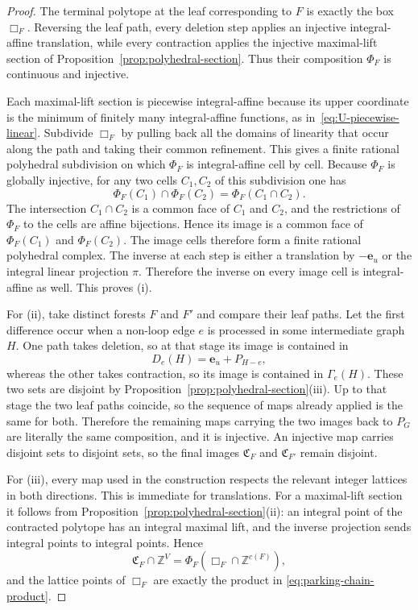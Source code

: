\documentclass[10pt,a4paper]{amsart}
\newcommand{\ZZ}{\mathbb Z}
\newcommand{\be}{\mathbf{e}}
\newcommand{\fC}{\mathfrak C}    %
\begin{document}
\begin{proof}
The terminal polytope at the leaf corresponding to $F$ is exactly the box
$\Box_F$.  Reversing the leaf path, every deletion step applies an injective
integral-affine translation, while every contraction applies the injective maximal-lift section of Proposition~\ref{prop:polyhedral-section}.  Thus their
composition $\Phi_F$ is continuous and injective.

Each maximal-lift section is piecewise integral-affine because its upper coordinate
is the minimum of finitely many integral-affine functions, as in~\eqref{eq:U-piecewise-linear}.
Subdivide $\Box_F$ by pulling back all the domains of linearity that occur along the path
and taking their common refinement.
This gives a finite rational polyhedral subdivision on which $\Phi_F$ is integral-affine cell by cell.
Because $\Phi_F$ is globally injective, for any two cells $C_1,C_2$ of this subdivision one has
\[
   \Phi_F(C_1)\cap\Phi_F(C_2)=\Phi_F(C_1\cap C_2).
\]
The intersection $C_1\cap C_2$ is a common face of $C_1$ and $C_2$, and the restrictions
of $\Phi_F$ to the cells are affine bijections.
Hence its image is a common face of $\Phi_F(C_1)$ and $\Phi_F(C_2)$.
The image cells therefore form a finite rational polyhedral complex.
The inverse at each step is either a translation by $-\be_u$ or the integral linear projection $\pi$.
Therefore the inverse on every image cell is integral-affine as well.  This proves (i).

For (ii), take distinct forests $F$ and $F'$ and compare their leaf paths.
Let the first difference occur when a non-loop edge $e$ is processed in some intermediate graph $H$.
One path takes deletion, so at that stage its image is contained in
\[
   D_e(H)=\be_u+P_{H-e},
\]
whereas the other takes contraction, so its image is contained in
$\Gamma_e(H)$.  These two sets are disjoint by
Proposition~\ref{prop:polyhedral-section}(iii).  Up to that stage the two leaf
paths coincide, so the sequence of maps already applied is the same for both.
Therefore the remaining maps carrying the two images back to $P_G$ are
literally the same composition, and it is injective.
An injective map carries disjoint sets to disjoint sets, so the final images $\fC_F$ and $\fC_{F'}$ remain disjoint.

For (iii), every map used in the construction respects the relevant integer
lattices in both directions.  This is immediate for translations.  For a
maximal-lift section it follows from
Proposition~\ref{prop:polyhedral-section}(ii): an integral point of the
contracted polytope has an integral maximal lift, and the inverse projection
sends integral points to integral points.  Hence
\[
   \fC_F\cap\ZZ^V
   =\Phi_F(\Box_F\cap\ZZ^{c(F)}),
\]
and the lattice points of $\Box_F$ are exactly the product in
\eqref{eq:parking-chain-product}.


\end{proof}
\end{document}
